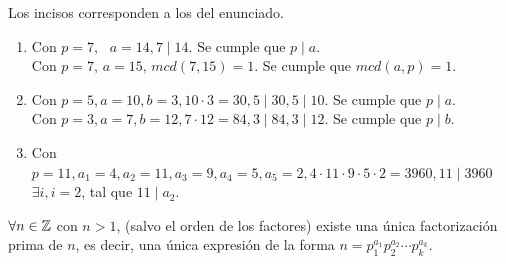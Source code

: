 \begin{ejemplo} Los incisos corresponden a los del enunciado. \\
\begin{enumerate}[label=\roman*)]
\item Con $p = 7$, \, $a = 14, 7 \mid 14$. Se cumple que $p \mid a$.\\
\hspace*{1em} Con $p = 7, \, a = 15, \, mcd(7,15) = 1$. Se cumple que $mcd(a,p) = 1$.
\item Con $p = 5, a = 10, b = 3, 10 \cdot 3 = 30, 5 \mid 30, 5 \mid 10$. Se cumple que $p \mid a$. \\
\hspace*{1em} Con $p = 3, a = 7, b = 12, 7 \cdot 12 = 84, 3 \mid 84, 3 \mid 12$. Se cumple que $p \mid b$.
\item Con $p = 11, a_1 = 4, a_2 = 11, a_3 = 9, a_4 = 5, a_5 = 2, 4 \cdot 11 \cdot 9 \cdot 5 \cdot 2 = 3960, 11 \mid 3960$ \\  \hspace*{1.2em} $\exists i, i = 2$, tal que $11 \mid a_2$. 
\end{enumerate}
\end{ejemplo}

\begin{enunciado}\label{enun:teorFundAritm}
$\forall n \in \mathbb{Z}$ \; con $n > 1$, (salvo el orden de los factores)  existe una única factorización prima de $n$, es decir, una única expresión de la forma $n = p_1^{a_1} p_2^{a_2} \cdots p_k^{a_k}$.
\end{enunciado}


